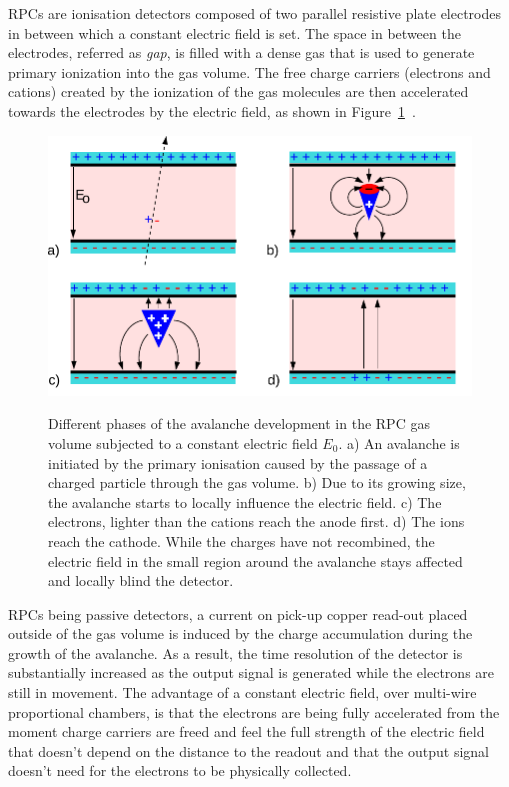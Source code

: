 	RPCs are ionisation detectors composed of two parallel resistive plate electrodes in between which a constant electric field is set. The space in between the electrodes, referred as \textit{gap}, is filled with a dense gas that is used to generate primary ionization into the gas volume. The free charge carriers (electrons and cations) created by the ionization of the gas molecules are then accelerated towards the electrodes by the electric field, as shown in Figure~\ref{fig:RPC_principle}~\cite{LIPPMANN2003}.
	
	\begin{figure}[!h]
		\centering
		\includegraphics[width = \plotwidth]{fig/chapt4/RPC_principle.pdf}\\
		\caption{\label{fig:RPC_principle} Different phases of the avalanche development in the RPC gas volume subjected to a constant electric field $E_0$. a) An avalanche is initiated by the primary ionisation caused by the passage of a charged particle through the gas volume. b) Due to its growing size, the avalanche starts to locally influence the electric field. c) The electrons, lighter than the cations reach the anode first. d) The ions reach the cathode. While the charges have not recombined, the electric field in the small region around the avalanche stays affected and locally blind the detector.}
	\end{figure}
	
	RPCs being passive detectors, a current on pick-up copper read-out placed outside of the gas volume is induced by the charge accumulation during the growth of the avalanche. As a result, the time resolution of the detector is substantially increased as the output signal is generated while the electrons are still in movement. The advantage of a constant electric field, over multi-wire proportional chambers, is that the electrons are being fully accelerated from the moment charge carriers are freed and feel the full strength of the electric field that doesn't depend on the distance to the readout and that the output signal doesn't need for the electrons to be physically collected.
	
